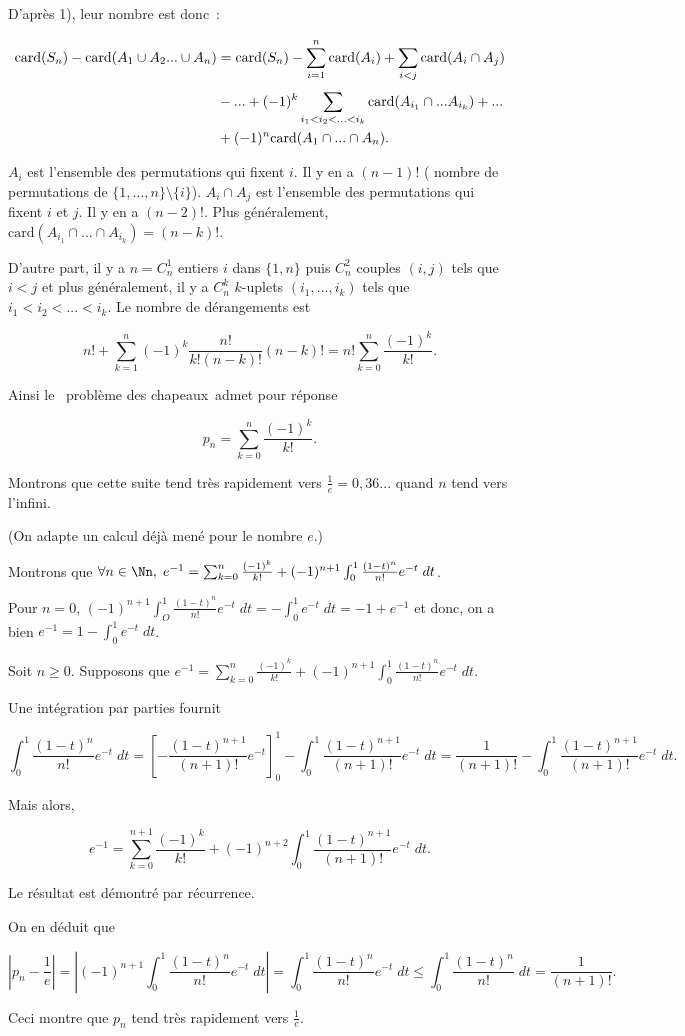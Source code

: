 {\begin{enumerate}
{D'après 1), leur nombre est donc~:

\begin{align*}\ensuremath
\mbox{card}(S_n)-\mbox{card}(A_1\cup A_2...\cup A_n)
&=\mbox{card}(S_n)-\sum_{i=1}^{n}\mbox{card}(A_i)+\sum_{i<j}^{}\mbox{card}(A_i\cap A_j)\\
 &-...+(-1)^{k}\sum_{i_1<i_2<...<i_k}^{}\mbox{card}(A_{i_1}\cap...A_{i_k})+...\\
 &+(-1)^{n}\mbox{card}(A_1\cap...\cap A_n).
\end{align*} 

$A_i$ est l'ensemble des permutations qui fixent $i$. Il y en a $(n-1)!$ ( nombre de permutations de $\{1,...,n\}\setminus\{i\}$). $A_i\cap A_j$ est l'ensemble des permutations qui fixent $i$ et $j$. Il y en a $(n-2)!$. Plus généralement, $\mbox{card}(A_{i_1}\cap...\cap A_{i_k})=(n-k)!$.

D'autre part, il y a $n=C_n^1$ entiers $i$ dans $\{1,n\}$ puis $C_n^2$ couples $(i,j)$ tels que $i<j$ et plus généralement, il y a $C_n^k$ $k$-uplets $(i_1,...,i_k)$ tels que $i_1<i_2< ...<i_k$. Le nombre de dérangements est  

$$n!+\sum_{k=1}^{n}(-1)^k\frac{n!}{k!(n-k)!}(n-k)!=n!\sum_{k=0}^{n}\frac{(-1)^k}{k!}.$$
 
Ainsi le \og~problème des chapeaux~\fg admet pour réponse

$$p_n=\sum_{k=0}^{n}\frac{(-1)^k}{k!}.$$ 

Montrons que cette suite tend très rapidement vers $\frac{1}{e}=0,36...$ quand $n$ tend vers l'infini.

(On adapte un  calcul déjà mené pour le nombre $e$.)

Montrons que $\forall n\in\Nn,\;e^{-1}=\sum_{k=0}^{n}\frac{(-1)^k}{k!}+(-1)^{n+1}\int_{0}^{1}\frac{(1-t)^n}{n!}e^{-t}\;dt$.

Pour $n=0$, $(-1)^{n+1}\int_{O}^{1}\frac{(1-t)^n}{n!}e^{-t}\;dt=-\int_{0}^{1}e^{-t}\;dt=-1+e^{-1}$ et donc, on a bien $e^{-1}=1-\int_{0}^{1}e^{-t}\;dt$.

Soit $n\geq0$. Supposons que $e^{-1}=\sum_{k=0}^{n}\frac{(-1)^k}{k!}+(-1)^{n+1}\int_{0}^{1}\frac{(1-t)^n}{n!}e^{-t}\;dt$.

Une intégration par parties fournit

$$\int_{0}^{1}\frac{(1-t)^n}{n!}e^{-t}\;dt=\left[-\frac{(1-t)^{n+1}}{(n+1)!}e^{-t}\right]_0^1-\int_{0}^{1}\frac{(1-t)^{n+1}}{(n+1)!}e^{-t}\;dt=\frac{1}{(n+1)!}-\int_{0}^{1}\frac{(1-t)^{n+1}}{(n+1)!}e^{-t}\;dt.$$

Mais alors,

$$e^{-1}=\sum_{k=0}^{n+1}\frac{(-1)^k}{k!}+(-1)^{n+2}\int_{0}^{1}\frac{(1-t)^{n+1}}{(n+1)!}e^{-t}\;dt.$$

Le résultat est démontré par récurrence.

On en déduit que

$$|p_n-\frac{1}{e}|=\left|(-1)^{n+1}\int_{0}^{1}\frac{(1-t)^n}{n!}e^{-t}\;dt\right|
=\int_{0}^{1}\frac{(1-t)^n}{n!}e^{-t}\;dt\leq\int_{0}^{1}\frac{(1-t)^n}{n!}\;dt=\frac{1}{(n+1)!}.$$

Ceci montre que $p_n$ tend très rapidement vers $\frac{1}{e}$.}
\end{enumerate}
}
